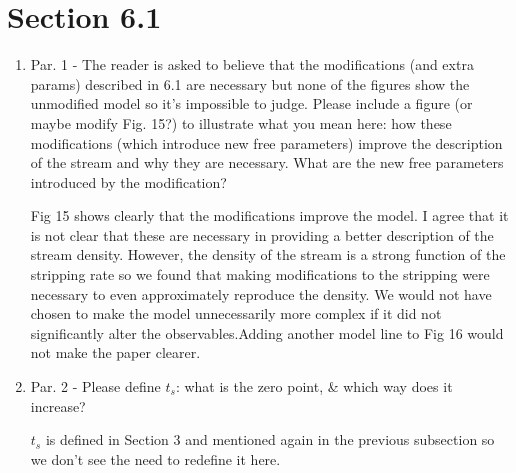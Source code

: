 \documentclass{article}
\begin{document}
\section{Section 6.1}
\begin{enumerate}
\item Par. 1 - The reader is asked to believe that the modifications (and extra params)
described in 6.1 are necessary but none of the figures show the unmodified model so
it’s impossible to judge. Please include a figure (or maybe modify Fig. 15?) to illustrate
what you mean here: how these modifications (which introduce new free parameters)
improve the description of the stream and why they are necessary. What are the new
free parameters introduced by the modification?

{\color{red} Fig 15 shows clearly that the modifications improve the model. I agree that it is not clear that these are necessary in providing a better description of the stream density. However, the density of the stream is a strong function of the stripping rate so we found that making modifications to the stripping were necessary to even approximately reproduce the density. We would not have chosen to make the model unnecessarily more complex if it did not significantly alter the observables.Adding another model line to Fig 16 would not make the paper clearer.}

\item Par. 2 - Please define $t_s$: what is the zero point, \& which way does it increase?

{\color{red} $t_s$ is defined in Section 3 and mentioned again in the previous subsection so we don't see the need to redefine it here.}
\end{enumerate}
\end{document}
